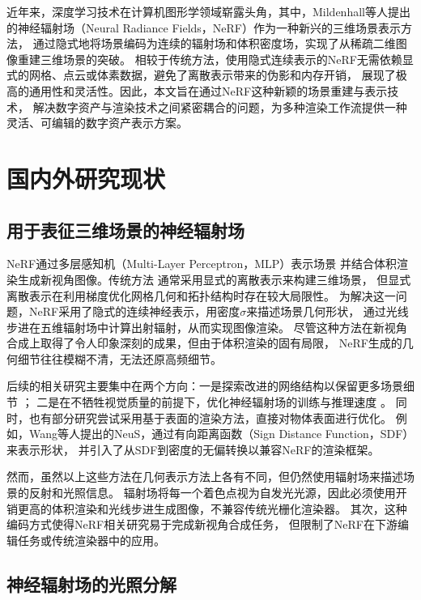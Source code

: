 近年来，深度学习技术在计算机图形学领域崭露头角，其中，Mildenhall等人\cite{Mildenhall_2020}提出的神经辐射场（Neural Radiance Fields，NeRF）作为一种新兴的三维场景表示方法，
通过隐式地将场景编码为连续的辐射场和体积密度场，实现了从稀疏二维图像重建三维场景的突破。
相较于传统方法，使用隐式连续表示的NeRF无需依赖显式的网格、点云或体素数据，避免了离散表示带来的伪影和内存开销，
展现了极高的通用性和灵活性。因此，本文旨在通过NeRF这种新颖的场景重建与表示技术，
解决数字资产与渲染技术之间紧密耦合的问题，为多种渲染工作流提供一种灵活、可编辑的数字资产表示方案。

\section{国内外研究现状}
\subsection{用于表征三维场景的神经辐射场}
NeRF通过多层感知机（Multi-Layer Perceptron，MLP）表示场景
并结合体积渲染生成新视角图像。传统方法
\cite{Waechter_2014, Mildenhall_2019, wu2020adversarial, Aliev_2020, Dai_2015}
通常采用显式的离散表示来构建三维场景，
但显式离散表示在利用梯度优化网格几何和拓扑结构时存在较大局限性。
为解决这一问题，NeRF采用了隐式的连续神经表示，用密度$\sigma$来描述场景几何形状，
通过光线步进在五维辐射场中计算出射辐射，从而实现图像渲染。
尽管这种方法在新视角合成上取得了令人印象深刻的成果，但由于体积渲染的固有局限，
NeRF生成的几何细节往往模糊不清，无法还原高频细节。

后续的相关研究主要集中在两个方向：一是探索改进的网络结构以保留更多场景细节
\cite{Chen_2022,Barron_2021,Barron_2022,dave2022pandora}；
二是在不牺牲视觉质量的前提下，优化神经辐射场的训练与推理速度
\cite{Reiser_2021,Martin_Brualla_2021}。
同时，也有部分研究尝试采用基于表面的渲染方法，直接对物体表面进行优化。
例如，Wang等人\cite{10.5555/3540261.3542342}提出的NeuS，通过有向距离函数（Sign Distance Function，SDF）来表示形状，
并引入了从SDF到密度的无偏转换以兼容NeRF的渲染框架。

然而，虽然以上这些方法在几何表示方法上各有不同，但仍然使用辐射场来描述场景的反射和光照信息。
辐射场将每一个着色点视为自发光光源，因此必须使用开销更高的体积渲染和光线步进生成图像，不兼容传统光栅化渲染器。
其次，这种编码方式使得NeRF相关研究易于完成新视角合成任务，
但限制了NeRF在下游编辑任务或传统渲染器中的应用。


\subsection{神经辐射场的光照分解} \label{sec:light_decomposition}

